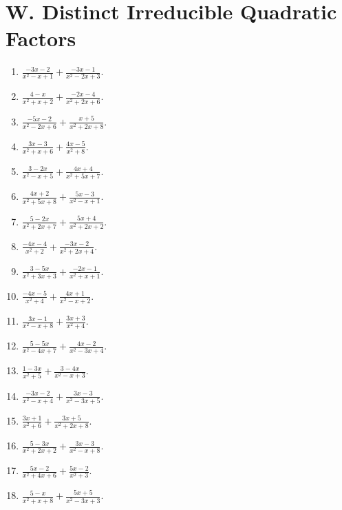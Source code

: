 \documentclass[11pt,oneside]{book}
\begin{document}
\section*{W. Distinct Irreducible Quadratic Factors}
\begin{enumerate}[leftmargin=*,label=\textbf{W\arabic*.},itemsep=0.45\baselineskip]
\item $\displaystyle \frac{- 3 x - 2}{x^{2} - x + 1} + \frac{- 3 x - 1}{x^{2} - 2 x + 3}$.
\item $\displaystyle \frac{4 - x}{x^{2} + x + 2} + \frac{- 2 x - 4}{x^{2} + 2 x + 6}$.
\item $\displaystyle \frac{- 5 x - 2}{x^{2} - 2 x + 6} + \frac{x + 5}{x^{2} + 2 x + 8}$.
\item $\displaystyle \frac{3 x - 3}{x^{2} + x + 6} + \frac{4 x - 5}{x^{2} + 8}$.
\item $\displaystyle \frac{3 - 2 x}{x^{2} - x + 5} + \frac{4 x + 4}{x^{2} + 5 x + 7}$.
\item $\displaystyle \frac{4 x + 2}{x^{2} + 5 x + 8} + \frac{5 x - 3}{x^{2} - x + 1}$.
\item $\displaystyle \frac{5 - 2 x}{x^{2} + 2 x + 7} + \frac{5 x + 4}{x^{2} + 2 x + 2}$.
\item $\displaystyle \frac{- 4 x - 4}{x^{2} + 2} + \frac{- 3 x - 2}{x^{2} + 2 x + 4}$.
\item $\displaystyle \frac{3 - 5 x}{x^{2} + 3 x + 3} + \frac{- 2 x - 1}{x^{2} + x + 1}$.
\item $\displaystyle \frac{- 4 x - 5}{x^{2} + 4} + \frac{4 x + 1}{x^{2} - x + 2}$.
\item $\displaystyle \frac{3 x - 1}{x^{2} - x + 8} + \frac{3 x + 3}{x^{2} + 4}$.
\item $\displaystyle \frac{5 - 5 x}{x^{2} - 4 x + 7} + \frac{4 x - 2}{x^{2} - 3 x + 4}$.
\item $\displaystyle \frac{1 - 3 x}{x^{2} + 5} + \frac{3 - 4 x}{x^{2} - x + 3}$.
\item $\displaystyle \frac{- 3 x - 2}{x^{2} - x + 4} + \frac{3 x - 3}{x^{2} - 3 x + 5}$.
\item $\displaystyle \frac{3 x + 1}{x^{2} + 6} + \frac{3 x + 5}{x^{2} + 2 x + 8}$.
\item $\displaystyle \frac{5 - 3 x}{x^{2} + 2 x + 2} + \frac{3 x - 3}{x^{2} - x + 8}$.
\item $\displaystyle \frac{5 x - 2}{x^{2} + 4 x + 6} + \frac{5 x - 2}{x^{2} + 3}$.
\item $\displaystyle \frac{5 - x}{x^{2} + x + 8} + \frac{5 x + 5}{x^{2} - 3 x + 3}$.

\end{enumerate}
\end{document}
